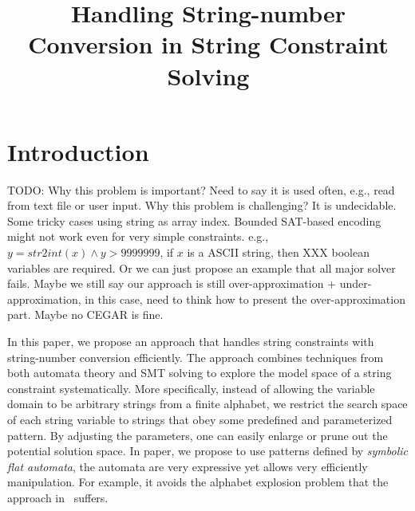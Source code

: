 \documentclass{llncs}
\title{Handling String-number Conversion in String Constraint Solving}
\author{}
\institute{}
\begin{document}
\newcommand{\hide}[1]{}

\newcommand{\todo}[1]{{\color{blue}TODO: #1}}
\newcommand{\sti}[1]{\mbox{\textbf{toInt}($#1$)}}
\newcommand{\its}[1]{\mbox{\textbf{toStr}($#1$)}}
\newcommand{\varn}{\mbox{$\mathbb{V}_n$}}
\newcommand{\vars}{\mbox{$\mathbb{V}_s$}}
\newcommand{\cvar}{\mbox{$\mathbb{C}$}}
\newcommand{\modelof}[1]{[\![#1]\!]}
\newcommand{\true}{\mbox{$\mathsf{true}$}}


\newcommand{\enc}[1]{Enc(#1)}
\newcommand{\ch}[1]{\mbox{`#1'}}
\maketitle


\section{Introduction} \label{section:introduction}

\todo{Why this problem is important? Need to say it is used often, e.g., read 
from text file or user input. Why this problem is challenging? It is undecidable. Some tricky cases 
using string as array index. Bounded SAT-based encoding might not work even for 
very simple constraints. e.g., $y=str2int(x) \wedge y>9999999$, if $x$ is a 
ASCII string, then XXX boolean variables are required. Or we can just propose 
an example that all major solver fails. Maybe we still say our approach is still over-approximation + under-approximation, in this case, need to think how to present the over-approximation part. Maybe no CEGAR is fine.}


In this paper, we propose an approach that handles string constraints with string-number conversion efficiently. The approach combines techniques from both automata theory and SMT solving to explore the model space of a string constraint systematically. More specifically, instead of allowing the variable domain to be arbitrary strings from a finite alphabet, we restrict the search space of each string variable to strings that obey some predefined and parameterized pattern. By adjusting the parameters, one can easily enlarge or prune out the potential solution space. In paper, we propose to use patterns defined by \emph{symbolic flat automata}, the automata are very expressive yet allows very efficiently manipulation. For example, it avoids the alphabet 
explosion problem that the approach in~\cite{PLDI2017} suffers.
\end{document}
